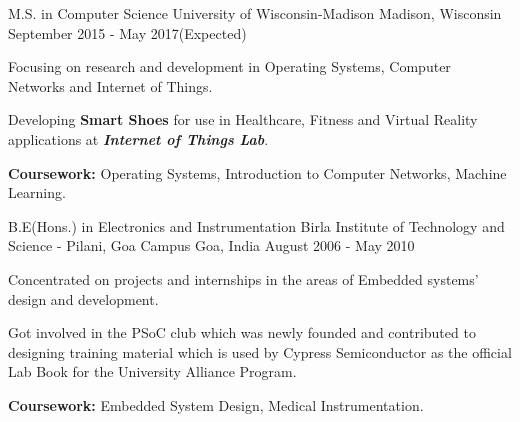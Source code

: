 \begin{cventries}
  \cventry
    {M.S. in Computer Science}
    {University of Wisconsin-Madison}
    {Madison, Wisconsin}
    {September 2015 - May 2017(Expected)}
    {
      \begin{cvitems}
        \item{Focusing on research and development in Operating Systems, Computer Networks and Internet of Things.}
        \item{Developing \textbf{Smart Shoes} for use in Healthcare, Fitness and Virtual Reality applications at \textbf{\textit{Internet of Things Lab}}.}
        \item{\textbf{Coursework:} Operating Systems, Introduction to Computer Networks, Machine Learning.}
      \end{cvitems}
    }

  \cventry
    {B.E(Hons.) in Electronics and Instrumentation}
    {Birla Institute of Technology and Science - Pilani, Goa Campus}
    {Goa, India}
    {August 2006 - May 2010}
    {
      \begin{cvitems}
        \item{Concentrated on projects and internships in the areas of Embedded systems' design and development.}
        \item{Got involved in the PSoC club which was newly founded and contributed to designing training material which is used by Cypress Semiconductor as the official Lab Book for the University Alliance Program.}
        \item{\textbf{Coursework:} Embedded System Design, Medical Instrumentation.}
      \end{cvitems}
    }
\end{cventries}
